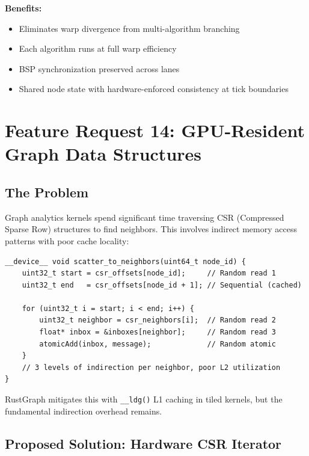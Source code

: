 \documentclass[11pt,a4paper]{article}
\newenvironment{benefitsbox}{%
    \vspace{6pt}%
    \noindent\textbf{Benefits:}%
    \begin{itemize}[leftmargin=1.5em,topsep=2pt,itemsep=1pt]%
}{%
    \end{itemize}%
    \vspace{6pt}%
}
\begin{document}
\begin{benefitsbox}
    \item Eliminates warp divergence from multi-algorithm branching
    \item Each algorithm runs at full warp efficiency
    \item BSP synchronization preserved across lanes
    \item Shared node state with hardware-enforced consistency at tick boundaries
\end{benefitsbox}

\newpage

\section{Feature Request 14: GPU-Resident Graph Data Structures}

\subsection{The Problem}

Graph analytics kernels spend significant time traversing CSR (Compressed Sparse Row) structures to find neighbors. This involves indirect memory access patterns with poor cache locality:

\begin{lstlisting}[style=cstyle,title={Current: software CSR traversal}]
__device__ void scatter_to_neighbors(uint64_t node_id) {
    uint32_t start = csr_offsets[node_id];     // Random read 1
    uint32_t end   = csr_offsets[node_id + 1]; // Sequential (cached)

    for (uint32_t i = start; i < end; i++) {
        uint32_t neighbor = csr_neighbors[i];  // Random read 2
        float* inbox = &inboxes[neighbor];     // Random read 3
        atomicAdd(inbox, message);             // Random atomic
    }
    // 3 levels of indirection per neighbor, poor L2 utilization
}
\end{lstlisting}

RustGraph mitigates this with \texttt{\_\_ldg()} L1 caching in tiled kernels, but the fundamental indirection overhead remains.

\subsection{Proposed Solution: Hardware CSR Iterator}
\end{document}

